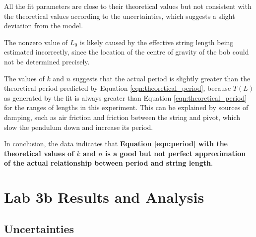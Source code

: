 \documentclass[aps,twocolumn,secnumarabic,nobalancelastpage,amsmath,amssymb,nofootinbib,floatfix,letterpaper]{revtex4}
\begin{document}
All the fit parameters are close to their theoretical values but not consistent with the theoretical values according to
the uncertainties, which suggests a slight deviation from the model.

The nonzero value of \(L_0\) is likely caused by the effective string length being estimated incorrectly, since the
location of the centre of gravity of the bob could not be determined precisely.

The values of \(k\) and \(n\) suggests that the actual period is slightly greater than the theoretical period predicted
by Equation \ref{eqn:theoretical_period}, because \(T(L)\) as generated by the fit is always greater than Equation
\ref{eqn:theoretical_period} for the ranges of lengths in this experiment. This can be explained by sources of damping,
such as air friction and friction between the string and pivot, which slow the pendulum down and increase its period.

In conclusion, the data indicates that \textbf{Equation \ref{eqn:period} with the theoretical values of \(k\) and \(n\)
is a good but not perfect approximation of the actual relationship between period and string length}.


\section{Lab 3b Results and Analysis}

\subsection{Uncertainties}
\label{sec:lab3b_uncertainties}
\end{document}
